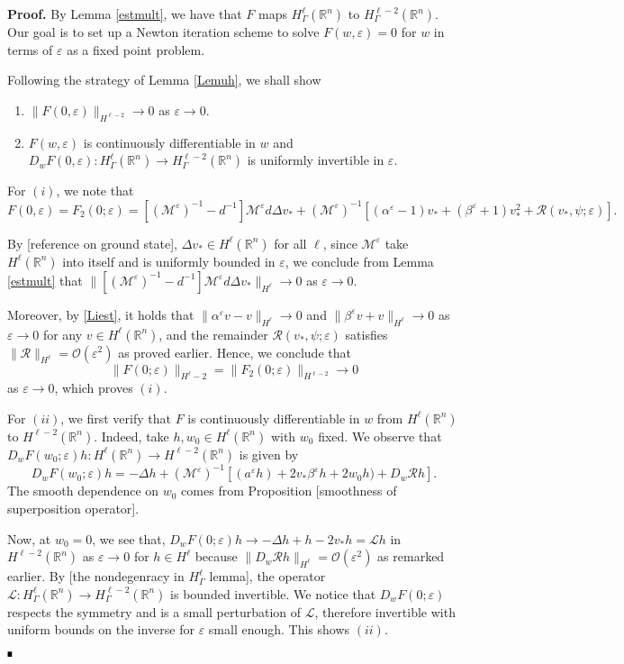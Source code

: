 \documentclass[letterpaper,11pt]{article}
\newcommand{\R}{\mathbb{R}}
\newcommand{\rmO}{\mathcal{O}}
\newcommand{\eps}{\varepsilon}
\newcommand{\Rm}{\mathcal{R}}
\newcommand{\M}{\mathcal{M}}
\newcommand{\cL}{\mathcal{L}}
\numberwithin{equation}{section}
\theoremstyle{plain}
\theoremstyle{remark}
\newenvironment{Proof}[1][.]%
 {\begin{trivlist}\item[]\textbf{Proof#1 }}%
 {\hspace*{\fill}$\rule{0.3\baselineskip}{0.35\baselineskip}$\end{trivlist}}
\begin{document}
\begin{Proof}
By Lemma \ref{estmult}, we have that $F$ maps $H^\ell_{\Gamma}(\R^n)$ to $H_{\Gamma}^{\ell-2}(\R^n)$. Our goal is to set up a Newton iteration scheme to solve $ F(w,\eps) =0$ for $w$ in terms of $\eps$ as a fixed point problem.

Following the strategy of Lemma \ref{Lemuh}, we shall show
\begin{enumerate}
\item $\|F(0,\eps)\|_{H^{\ell-2}} \to 0$ as $\eps \to 0$.
\item $F(w,\eps)$ is continuously differentiable in $w$ and $D_wF(0,\eps): H^{\ell}_{\Gamma}(\R^n) \to H^{\ell-2}_{\Gamma}(\R^n)$ is uniformly invertible in $\eps$.
\end{enumerate}
For $(i)$, we note that
\[
F(0,\eps) = F_2(0;\eps) = [(\M^{\eps})^{-1}-d^{-1}]\M^\eps d \Delta v_*+(\M^\eps)^{-1}[(\alpha^\eps-1)v_*+(\beta^\eps+1)v_*^2+\Rm(v_*,\psi;\eps)].
\]

By [reference on ground state], $\Delta v_* \in H^\ell(\R^n)$ for all $\ell$, since $\M^\eps$ take $H^\ell(\R^n)$ into itself and is uniformly bounded in $\eps$, we conclude from Lemma \ref{estmult} that 
$\|[(\M^{\eps})^{-1}-d^{-1}]\M^\eps d \Delta v_* \|_{H^\ell} \to 0$
as $\eps \to 0$.

Moreover, by  \eqref{Liest}, it holds that $\| \alpha^\eps v -v\|_{H^\ell} \to 0$ and $\| \beta^\eps v + v\|_{H^\ell} \to 0$ as $\eps \to 0$ for any $v \in H^\ell(\R^n)$, and the remainder $\Rm(v_*,\psi;\eps)$ satisfies $\|\Rm\|_{H^\ell} = \rmO(\eps^2)$ as proved earlier. Hence, we conclude that 
\[
\| F(0;\eps)\|_{H^\ell-2} = \| F_2(0;\eps)\|_{H^{\ell-2} }\to 0
\]
as $\eps \to 0$, which proves $(i)$.

For $(ii)$, we first verify that $F$ is continuously differentiable in $w$ from $H^\ell (\R^n)$ to $H^{\ell-2}(\R^n)$. Indeed, take $h, w_0\in H^\ell(\R^n)$ with $w_0$ fixed. We observe that $D_wF(w_0;\eps)h:H^\ell (\R^n) \to H^{\ell-2}(\R^n)$ is given by
\[
D_wF(w_0;\eps)h = -\Delta h+(\M^\eps)^{-1}\left[(a^\eps h)+2v_*\beta^\eps h + 2w_0h)+D_w\Rm h\right].
\]
The smooth dependence on $w_0$ comes from Proposition [smoothness of superposition operator].

Now, at $w_0 = 0$, we see that, $D_wF(0;\eps)h \to -\Delta h+h-2v_*h = \cL h$ in $H^{\ell-2}(\R^n)$ as $\eps \to 0$ for $h \in H^\ell$ because $\|D_w\Rm h\|_{H^\ell} = \rmO(\eps^2)$ as remarked earlier. By [the nondegenracy in $H^\ell_\Gamma$ lemma], the operator $\cL : H^\ell_{\Gamma}(\R^n) \to H^{\ell-2}_{\Gamma}(\R^n)$ is bounded invertible. We notice that $D_wF(0;\eps)$ respects the symmetry and is a small perturbation of $\cL$, therefore invertible with uniform bounds on the inverse for $\eps$ small enough. This shows $(ii)$.


\end{Proof}
\end{document}
